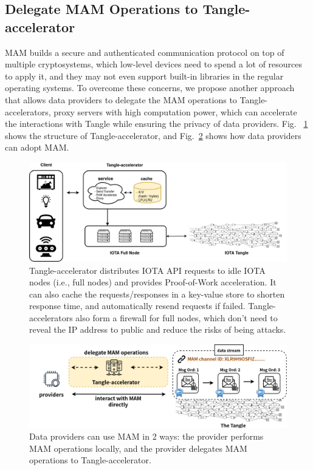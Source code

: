 \begin{spacing}{2.0}
\section{Delegate MAM Operations to Tangle-accelerator}
\label{section:ta_endpoint}
MAM builds a secure and authenticated communication protocol on top of multiple cryptosystems, which low-level devices need to spend a lot of resources to apply it, and they may not even support built-in libraries in the regular operating systems. To overcome these concerns, we propose another approach that allows data providers to delegate the MAM operations to Tangle-accelerators, proxy servers with high computation power, which can accelerate the interactions with Tangle while ensuring the privacy of data providers. Fig.~ \ref{fig:ta_struct} shows the structure of Tangle-accelerator, and Fig.~\ref{fig:delegation} shows how data providers can adopt MAM.
\clearpage

\begin{figure}[t]
    \centering
    \includegraphics[width=5.5in]{img/ta_structure}
    \caption{Tangle-accelerator distributes IOTA API requests to idle IOTA nodes (i.e., full nodes) and provides Proof-of-Work acceleration. It can also cache the requests/responses in a key-value store to shorten response time, and automatically resend requests if failed. Tangle-accelerators also form a firewall for full nodes, which don't need to reveal the IP address to public and reduce the risks of being attacks.}
    \label{fig:ta_struct}
\end{figure}

\begin{figure}[b]
    \centering
    \includegraphics[width=\linewidth]{img/delegation}
    \caption{Data providers can use MAM in 2 ways: the provider performs MAM operations locally, and the provider delegates MAM operations to Tangle-accelerator.}
    \label{fig:delegation}
\end{figure}
\clearpage


\end{spacing}
